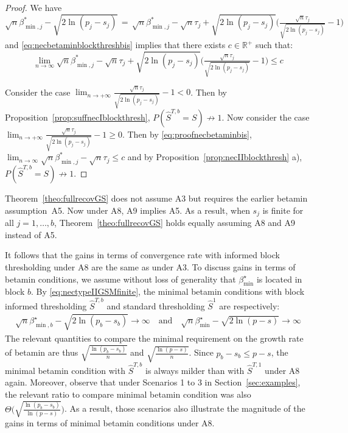 \documentclass[aos]{imsart}
\theoremstyle{plain}
\newcommand{\R}{\mathbb{R}}
\begin{document}
\begin{proof}

  We have $\sqrt{n}\beta_{\min,j}^*-\sqrt{2\ln(p_j-s_j)} \,=\, \sqrt{n}\beta_{\min,j}^*-\sqrt{n}\tau_j+\sqrt{2\ln(p_j-s_j)}\Big(\tfrac{\sqrt{n}\tau_j}{\sqrt{2\ln(p_j-s_j)}}-1\Big)$ and \eqref{eq:necbetaminblockthreshbis} implies that there exists $c\in\R^+$ such that:
  \begin{equation}\label{eq:proofnecbetaminbis}
      \lim_{n\to \infty}\sqrt{n}\beta_{\min,j}^*-\sqrt{n}\tau_j+\sqrt{2\ln(p_j-s_j)}\Big(\tfrac{\sqrt{n}\tau_j}{\sqrt{2\ln(p_j-s_j)}}-1\Big)\leq c
  \end{equation}

Consider the case $\lim_{n\to +\infty}\tfrac{\sqrt{n}\tau_j}{\sqrt{2\ln(p_j-s_j)}}-1<0$. Then by Proposition~\ref{prop:suffnecIblockthresh},
$P(\hat{S}^{T,b} = S)\not \to 1$. 
Now consider the case $\lim_{n\to +\infty}\tfrac{\sqrt{n}\tau_j}{\sqrt{2\ln(p_j-s_j)}}-1 \geq0$. Then by \eqref{eq:proofnecbetaminbis},  $\lim_{n\to \infty}\sqrt{n}\beta_{\min,j}^*-\sqrt{n}\tau_j \leq c$ and by Proposition~\ref{prop:necIIblockthresh} a), $P(\hat{S}^{T,b} = S)\not \to 1$.
\end{proof}

Theorem~\ref{theo:fullrecovGS} does not assume A3 but requires the earlier betamin assumption~A5. Now under A8, A9 implies A5. As a result, when $s_j$ is finite for all $j=1,\ldots,b$, Theorem~\ref{theo:fullrecovGS} holds equally assuming A8 and A9 instead of A5.

It follows that the gains in terms of convergence rate with  informed block thresholding under A8 are the same as under A3. To discuss gains in terms of betamin conditions, we assume without loss of generality that $\beta_{\min}^{\star}$ is located in block $b$. By \eqref{eq:nectypeIIGSMfinite}, the minimal betamin conditions with block informed thresholding $\hat{S}^{T,b}$ and standard thresholding $\hat{S}^1$ are respectively:
\begin{align}
    \sqrt{n}\beta_{\min,b}^{\star}-\sqrt{2\ln(p_b-s_b)} \to \infty \quad\text{and}\quad
    \sqrt{n}\beta_{\min}^{\star}-\sqrt{2\ln(p-s)} \to \infty
\end{align}
The relevant quantities to compare the minimal requirement on the growth rate of betamin are thus $\sqrt{\tfrac{\ln(p_b-s_b)}{n}}$ and $\sqrt{\tfrac{\ln(p-s)}{n}}$. Since $p_b-s_b \leq p - s$, the minimal betamin condition with $\hat{S}^{T,b}$ is always milder than with $\hat{S}^{T,1}$ under A8 again. Moreover, observe that under Scenarios 1 to 3 in Section~\ref{sec:examples}, the relevant ratio to compare minimal betamin condition was also $\Theta\Big(\sqrt{\tfrac{\ln(p_b-s_b)}{\ln(p-s)}}\Big)$. As a result, those scenarios also illustrate the magnitude of the gains in terms of minimal betamin conditions under A8.
\end{document}
